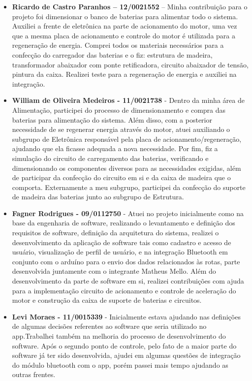 \begin{apendicesenv}
\begin{itemize}
		\item \textbf{Ricardo de Castro Paranhos – 12/0021552} – Minha contribuição para o projeto foi dimensionar o banco de baterias para alimentar todo o sistema. Auxiliei a frente de eletrônica na parte de acionamento do motor, uma vez que a mesma placa de acionamento e controle do motor é utilizada para a regeneração de energia. Comprei todos os materiais necessários para a confecção do carregador das baterias e o fiz: estrutura de madeira, transformador abaixador com ponte retificadora, circuito abaixador de tensão, pintura da caixa. Realizei teste para a regeneração de energia e auxiliei na integração. 
		
		\item \textbf{William de Oliveira Medeiros - 11/0021738} - Dentro da minha área de Alimentação, participei do processo de dimensionamento e compra das baterias para alimentação do sistema. Além disso, com a posterior necessidade de se regenerar energia através do motor, atuei auxiliando o subgrupo de Eletrônica responsável pela placa de acionamento/regeneração, ajudando que ela ficasse adequada a nova necessidade. Por fim, fiz a simulação do circuito de carregamento das baterias, verificando e dimensionando os componentes diversos para as necessidades exigidas, além de participar da confecção do circuito em si e da caixa de madeira que o comporta. Externamente a meu subgrupo, participei da confecção do suporte de madeira das baterias junto ao subgrupo de Estrutura. 
		
		\item \textbf{Fagner Rodrigues - 09/0112750} - Atuei no projeto inicialmente como na base da engenharia de software, realizando o levantamento e definição dos requisitos de software, definição da arquitetura do sistema, realizei o desenvolvimento da aplicação de software tais como cadastro e acesso de usuário, visualização de perfil de usuário, e na integração Bluetooth em conjunto com o arduíno para o envio dos dados relacionados às rotas, parte desenvolvida juntamente com o integrante Matheus Mello. Além do desenvolvimento da parte de software em si, realizei contribuições com ajuda para a implementação circuito de acionamento e controle de aceleração do motor e construção da caixa de suporte de baterias e circuitos.
		
		\item \textbf{Levi Moraes - 11/0015339} - Inicialmente estava ajudando nas definições de algumas decisões referentes ao software que seria utilizado no app.Trabalhei também na melhoria do processo de desenvolvimento do software. Após o segundo ponto de controle, pelo fato de a maior parte do software já ter sido desenvolvida, ajudei em algumas questões de integração do módulo bluetooth com o app, porém passei mais tempo ajudando as outras frentes.
		

\end{itemize}
\end{apendicesenv}
